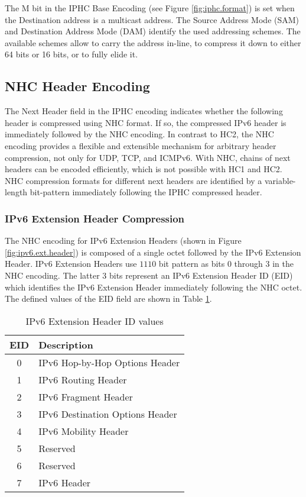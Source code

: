 \documentclass[12pt, titlepage, a4paper]{report}
\begin{document}
The M bit in the IPHC Base Encoding (see Figure \ref{fig:iphc.format}) is set when the Destination address is a multicast address. The Source Address Mode (SAM) and Destination Address Mode (DAM) identify the used addressing schemes. The available schemes allow to carry the address in-line, to compress it down to either 64 bits or 16 bits, or to fully elide it.

\subsection{NHC Header Encoding}\label{sec:nhc}
The Next Header field in the IPHC encoding indicates whether the following header is compressed using NHC format.  If so, the compressed IPv6 header is immediately followed by the NHC encoding. In contrast to HC2, the NHC encoding provides a flexible and extensible mechanism for arbitrary header compression, not only for UDP, TCP, and ICMPv6. With NHC, chains of next headers can be encoded efficiently, which is not possible with HC1 and HC2. NHC compression formats for different next headers are identified by a variable-length bit-pattern immediately following the IPHC compressed header.

\subsubsection{IPv6 Extension Header Compression}
The NHC encoding for IPv6 Extension Headers (shown in Figure \ref{fig:ipv6.ext.header}) is composed of a single octet followed by the IPv6 Extension Header.  IPv6 Extension Headers use  $1110$ bit pattern as bits $0$ through $3$ in the NHC encoding. The latter 3 bits represent an IPv6 Extension Header ID (EID) which identifies the IPv6 Extension Header immediately following the NHC octet. The defined values of the EID field are shown in Table \ref{table:ipv6.ext.header}. 
\begin{table}[htp]
\begin{center}
        \begin{tabular}{|c|l|}
          \hline
          EID & Description\\
          \hline
          \hline          
           0 & IPv6 Hop-by-Hop Options Header \cite{rfc2460}\\
           1 & IPv6 Routing Header \cite{rfc2460}\\
           2 & IPv6 Fragment Header \cite{rfc2460}\\
           3 & IPv6 Destination Options Header \cite{rfc2460}\\
           4 & IPv6 Mobility Header \cite{rfc3775}\\
           5 & Reserved\\
           6 & Reserved\\
           7 & IPv6 Header\\
          \hline
        \end{tabular}
\end{center}
\caption{IPv6 Extension Header ID values}\label{table:ipv6.ext.header}
\end{table}
\end{document}
